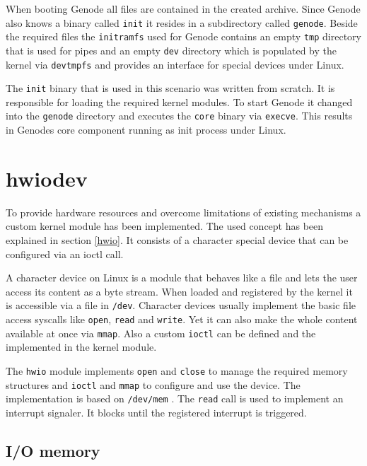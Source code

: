 \documentclass[
a4paper,
12pt,
notitlepage,
parskip=half,
DIV=11,
]{scrbook}
\begin{document}
		When booting Genode all files are contained in the created archive.
		Since Genode also knows a binary called \texttt{init} it resides in a subdirectory called \texttt{genode}.
		Beside the required files the \texttt{initramfs} used for Genode contains an empty \texttt{tmp} directory that is used for pipes and an empty \texttt{dev} directory which is populated by the kernel via \texttt{devtmpfs} and provides an interface for special devices under Linux.
		
		The \texttt{init} binary that is used in this scenario was written from scratch.
		It is responsible for loading the required kernel modules.
		To start Genode it changed into the \texttt{genode} directory and executes the \texttt{core} binary via \texttt{execve}.
		This results in Genodes core component running as init process under Linux.
		
		\section{hwiodev}
		\label{hwiodev}
		
		To provide hardware resources and overcome limitations of existing mechanisms a custom kernel module has been implemented.
		The used concept has been explained in section \ref{hwio}.
		It consists of a character special device that can be configured via an ioctl call.
		
		A character device on Linux is a module that behaves like a file and lets the user access its content as a byte stream.
		When loaded and registered by the kernel it is accessible via a file in \texttt{/dev}.
		Character devices usually implement the basic file access syscalls like \texttt{open}, \texttt{read} and \texttt{write}.
		Yet it can also make the whole content available at once via \texttt{mmap}.
		Also a custom \texttt{ioctl} can be defined and the implemented in the kernel module. \citep{books/daglib/0012446}
		
		The \texttt{hwio} module implements \texttt{open} and \texttt{close} to manage the required memory structures and \texttt{ioctl} and \texttt{mmap} to configure and use the device.
		The implementation is based on \texttt{/dev/mem} \citep{devmem}.
		The \texttt{read} call is used to implement an interrupt signaler.
		It blocks until the registered interrupt is triggered.
		
		\subsection{I/O memory}
		\label{hwioiomem}
		
\end{document}
